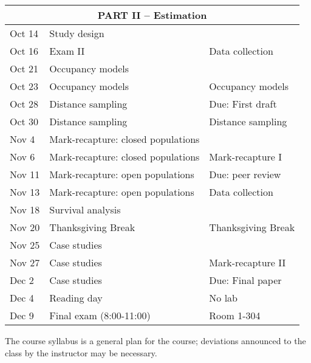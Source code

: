 \documentclass[12pt]{article}
\begin{document}
\begin{center}
\begin{tabular}[c]{lll}
\hline
           \multicolumn{3}{c}{PART II -- Estimation}                                   \\
\hline
Oct 14     & Study design                       &                                      \\
Oct 16     & Exam II                            & Data collection                      \\
\hline
Oct 21     & Occupancy models                   &                                      \\
Oct 23     & Occupancy models                   & Occupancy models                     \\
\hline
Oct 28     & Distance sampling                  & Due: First draft                     \\
Oct 30     & Distance sampling                  & Distance sampling                    \\
\hline
Nov 4      & Mark-recapture: closed populations &                                      \\
Nov 6      & Mark-recapture: closed populations & Mark-recapture I                     \\
\hline
Nov 11     & Mark-recapture: open populations   & Due: peer review                     \\
Nov 13     & Mark-recapture: open populations   & Data collection                      \\
\hline
Nov 18     & Survival analysis                  &                                      \\
Nov 20     & Thanksgiving Break                 & Thanksgiving Break                   \\
\hline
Nov 25     & Case studies                       &                                      \\
Nov 27     & Case studies                       & Mark-recapture II                    \\
\hline
Dec 2      & Case studies                       & Due: Final paper                     \\
Dec 4      & Reading day                        & No lab                               \\
\hline
Dec 9     & Final exam (8:00-11:00)            &  Room 1-304                                 \\
\hline \hline
\end{tabular}
\end{center}

The course syllabus is a general plan for the course; deviations announced to the class by the instructor may be necessary.
\end{document}
